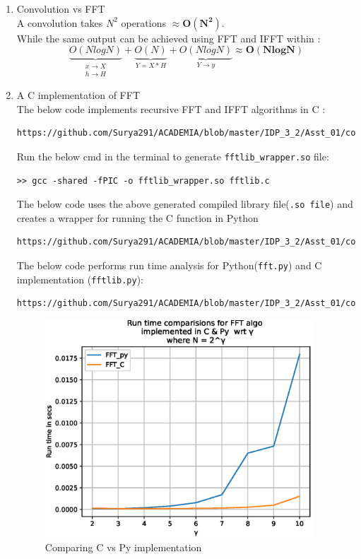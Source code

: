 \documentclass[journal,12pt,twocolumn]{IEEEtran}
\renewcommand\thesection{\arabic{section}}
\begin{document}
\begin{enumerate}[label=\thesection.\arabic*.,ref=\thesection.\theenumi]
\item Convolution vs FFT\\
A convolution takes $ N^{2}$ operations $\approx \boldsymbol{O(N^{2})}$.\\
While the same output can be achieved using FFT and IFFT within : 
\begin{equation}
   \underbrace{O(NlogN)}_{\substack{\text{$x \rightarrow X$} \\ {\text{$h \rightarrow H $}}  }} + 
   \underbrace{O(N)}_{\text{$Y = X*H$}} + 
   \underbrace{O(NlogN)}_{\text{$Y \rightarrow y$}} \approx \boldsymbol{O(NlogN)}
\end{equation}


\item A C implementation of FFT\\

The below code implements recursive FFT and IFFT algorithms in C : 

\begin{lstlisting}
https://github.com/Surya291/ACADEMIA/blob/master/IDP_3_2/Asst_01/codes/fftlib.c
\end{lstlisting}

Run the below cmd in the terminal to generate \texttt{fftlib\_wrapper.so} file:  
\begin{lstlisting}
>> gcc -shared -fPIC -o fftlib_wrapper.so fftlib.c
\end{lstlisting}

The below code uses the above generated compiled library file(\texttt{.so file}) and creates a wrapper for running the C function in Python
\begin{lstlisting}
https://github.com/Surya291/ACADEMIA/blob/master/IDP_3_2/Asst_01/codes/fftlib.py
\end{lstlisting}

The below code performs run time analysis for Python(\texttt{fft.py}) and C implementation (\texttt{fftlib.py}):
\begin{lstlisting}
https://github.com/Surya291/ACADEMIA/blob/master/IDP_3_2/Asst_01/codes/fftpy_vs_fftc.py
\end{lstlisting}


 \begin{figure}[!ht]
	\includegraphics[width=10cm]{figs/fftpy_vs_fftc.eps}
	\caption{Comparing C vs Py implementation}
\end{figure}



\end{enumerate}
\end{document}
